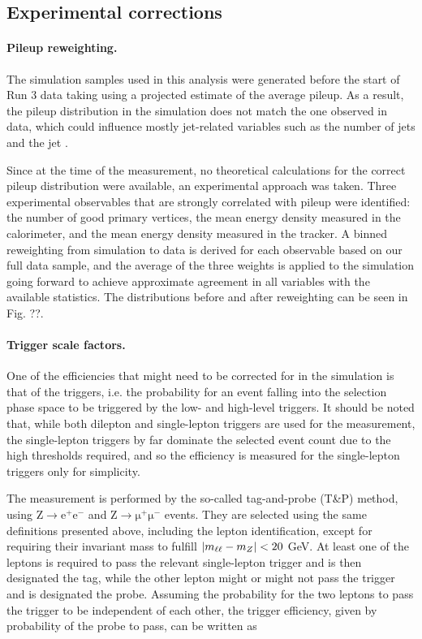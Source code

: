 \subsection{Experimental corrections}
\label{sec:ttxs:scalefactors}

\paragraph{Pileup reweighting.}

The simulation samples used in this analysis were generated before the start of Run 3 data taking using a projected estimate of the average pileup. As a result, the pileup distribution in the simulation does not match the one observed in data, which could influence mostly jet-related variables such as the number of jets and the jet \pt.

Since at the time of the measurement, no theoretical calculations for the correct pileup distribution were available, an experimental approach was taken. Three experimental observables that are strongly correlated with pileup were identified: the number of good primary vertices, the mean energy density measured in the calorimeter, and the mean energy density measured in the tracker. A binned reweighting from simulation to data is derived for each observable based on our full data sample, and the average of the three weights is applied to the simulation going forward to achieve approximate agreement in all variables with the available statistics. The distributions before and after reweighting can be seen in Fig. ??.

\paragraph{Trigger scale factors.}

One of the efficiencies that might need to be corrected for in the simulation is that of the triggers, i.e. the probability for an event falling into the selection phase space to be triggered by the low- and high-level triggers. It should be noted that, while both dilepton and single-lepton triggers are used for the measurement, the single-lepton triggers by far dominate the selected event count due to the high \pt thresholds required, and so the efficiency is measured for the single-lepton triggers only for simplicity.

The measurement is performed by the so-called tag-and-probe (T\&P) method, using $\mathrm{Z} \rightarrow \mathrm{e^+ e^-}$ and $\mathrm{Z} \rightarrow \mathrm{\mu^+ \mu^-}$ events. They are selected using the same definitions presented above, including the lepton identification, except for requiring their invariant mass to fulfill $| m_{\ell\ell} - m_Z | < 20$ GeV. At least one of the leptons is required to pass the relevant single-lepton trigger and is then designated the tag, while the other lepton might or might not pass the trigger and is designated the probe. Assuming the probability for the two leptons to pass the trigger to be independent of each other, the trigger efficiency, given by probability of the probe to pass, can be written as

